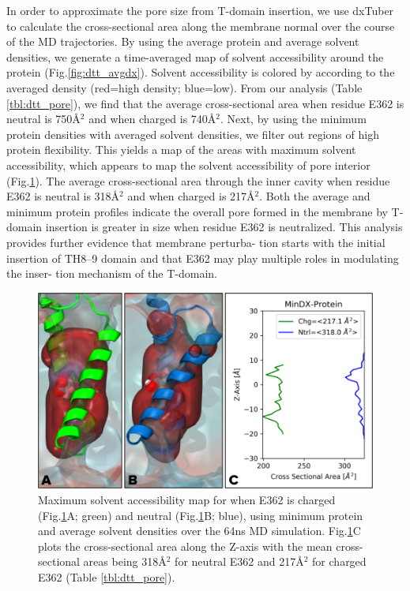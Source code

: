 In order to approximate the pore size from T-domain insertion, we use dxTuber to calculate the cross-sectional area along the membrane normal over the course of the MD trajectories. 
By using the average protein and average solvent densities, we generate a time-averaged map of solvent accessibility around the protein (Fig.\ref{fig:dtt_avgdx}).
Solvent accessibility is colored by according to the averaged density (red=high density; blue=low).
From our analysis (Table \ref{tbl:dtt_pore}), we find that the average cross-sectional area when residue E362 is neutral is 750\AA$^2$ and when charged is 740\AA$^2$.
Next, by using the minimum protein densities with averaged solvent densities, we filter out regions of high protein flexibility.
This yields a map of the areas with maximum solvent accessibility, which appears to map the solvent accessibility of pore interior (Fig.\ref{fig:dtt_mindx}).
The average cross-sectional area through the inner cavity when residue E362 is neutral is 318\AA$^2$ and when charged is 217\AA$^2$.
Both the average and minimum protein profiles indicate the overall pore formed in the membrane by T-domain insertion is greater in size when residue E362 is neutralized.
This analysis provides further evidence that membrane perturba- tion starts with the initial insertion of TH8–9 domain and that E362 may play multiple roles in modulating the inser- tion mechanism of the T-domain.

\begin{figure}[H]
\centering
\includegraphics[width=\linewidth,]{Figures/DTT/mindx.png}
\caption{Maximum solvent accessibility map for when E362 is charged (Fig.\ref{fig:dtt_mindx}A; green) and neutral (Fig.\ref{fig:dtt_mindx}B; blue), using minimum protein and average solvent densities over the 64ns MD simulation. Fig.\ref{fig:dtt_mindx}C plots the cross-sectional area along the Z-axis with the mean cross-sectional areas being 318\AA$^2$ for neutral E362 and 217\AA$^2$ for charged E362 (Table \ref{tbl:dtt_pore}).}
\label{fig:dtt_mindx}
\end{figure}

